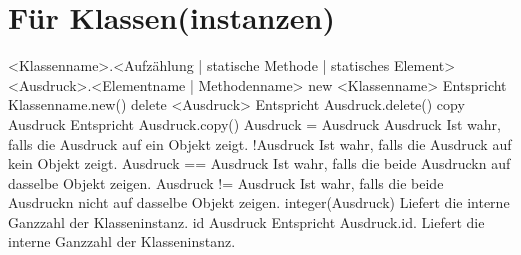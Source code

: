 \section{Für Klassen(instanzen)}
<Klassenname>.<Aufzählung | statische Methode | statisches Element>
<Ausdruck>.<Elementname | Methodenname>
new <Klassenname>				Entspricht Klassenname.new()
delete <Ausdruck>				Entspricht Ausdruck.delete()
copy Ausdruck					Entspricht Ausdruck.copy()
Ausdruck = Ausdruck
Ausdruck					Ist wahr, falls die Ausdruck auf ein Objekt zeigt.
!Ausdruck					Ist wahr, falls die Ausdruck auf kein Objekt zeigt.
Ausdruck == Ausdruck				Ist wahr, falls die beide Ausdruckn auf dasselbe Objekt zeigen.
Ausdruck != Ausdruck				Ist wahr, falls die beide Ausdruckn nicht auf dasselbe Objekt zeigen.
integer(Ausdruck)				Liefert die interne Ganzzahl der Klasseninstanz.
id Ausdruck					Entspricht Ausdruck.id. Liefert die interne Ganzzahl der Klasseninstanz.